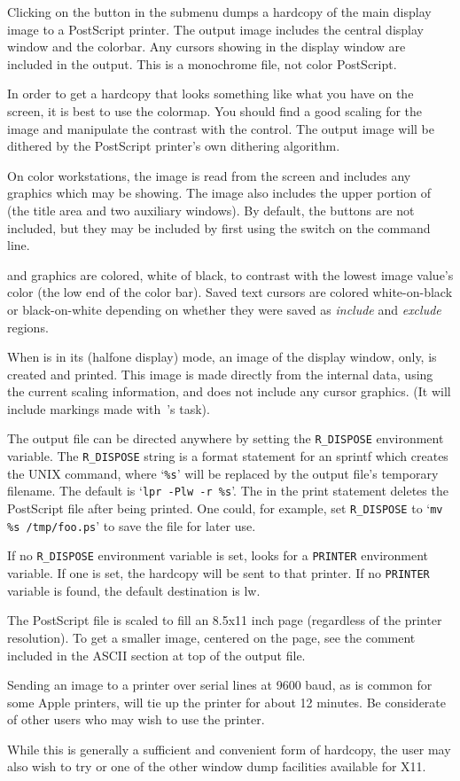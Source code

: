 Clicking on the  button in the  submenu dumps a hardcopy
of the main display image to a PostScript printer.  The output image
includes the central display window and the colorbar.  Any cursors
showing in the display window are included in the output.  This is
a monochrome file, not color PostScript.

In order to get a hardcopy that looks something like what you have on
the screen, it is best to use the  colormap.  You should find
a good scaling for the image and manipulate the contrast with the
 control.  The output image will be dithered by the PostScript
printer's own dithering algorithm.

On color workstations, the image is read from the screen and includes
any graphics which may be showing.  The image also includes the upper
portion of {\SAO} (the title area and two auxiliary windows).  By
default, the buttons are not included, but they may be included by
first using the  switch on the command line.

 and  graphics are colored, white of black, to contrast
with the lowest image value's color (the low end of the color bar).
Saved text cursors are colored white-on-black or black-on-white
depending on whether they were saved as {\em include} and {\em exclude} regions.

When {\SAO} is in its  (halfone display) mode, an image of the
display window, only, is created and printed.  This image is made
directly from the internal data, using the current scaling information,
and does not include any cursor graphics.  (It will include markings
made with {\IRAF}\,'s  task).

The output file can be directed anywhere by setting the \verb+R_DISPOSE+
environment variable.  The \verb+R_DISPOSE+ string is a format statement
for an sprintf which creates the UNIX command, where `\verb+%s+' will be
replaced by the output file's temporary filename.  The default is
`\verb+lpr -Plw -r %s+'.
The  in the print statement deletes the PostScript file after being
printed.  One could, for example, set \verb+R_DISPOSE+ to
`\verb+mv %s /tmp/foo.ps+' to save the file for later use.

If no \verb+R_DISPOSE+ environment variable is set, {\SAO} looks for a
\verb+PRINTER+ environment variable.  If one is set, the hardcopy will be
sent to that printer.  If no \verb+PRINTER+ variable is found, the default
destination is lw.

The PostScript file is scaled to fill an 8.5x11 inch page (regardless
of the printer resolution).  To get a smaller image, centered on the
page, see the comment included in the ASCII section at top of the
output file.

Sending an image to a printer over serial lines at 9600 baud, as is
common for some Apple printers, will tie up the printer for about 12
minutes.  Be considerate of other users who may wish to use the printer.

While this is generally a sufficient and convenient form of hardcopy,
the user may also wish to try  or one of the other window dump
facilities available for X11.


